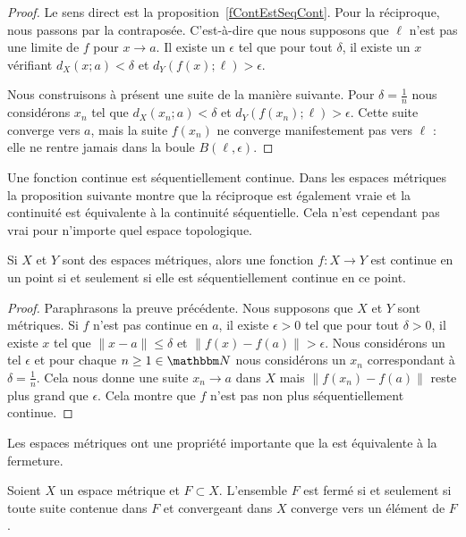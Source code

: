 \begin{proof}
  Le sens direct est la proposition~\ref{fContEstSeqCont}. Pour la réciproque, nous passons par la contraposée. C'est-à-dire que nous supposons que \( \ell\) n'est pas une limite de \( f\) pour \( x\to a\). Il existe un \( \epsilon\) tel que pour tout \( \delta\), il existe un \( x\) vérifiant \( d_X(x;a) <\delta\) et \( d_Y(f(x);\ell) >\epsilon\).

  Nous construisons à présent une suite de la manière suivante. Pour \( \delta=\frac{1}{ n }\) nous considérons \( x_n\) tel que \( d_X( x_n; a) <\delta\) et \( d_Y(f(x_n);\ell) > \epsilon \). Cette suite converge vers \( a\), mais la suite \( f(x_n)\) ne converge manifestement pas vers \( \ell\) : elle ne rentre jamais dans la boule \( B(\ell,\epsilon)\).
\end{proof}

Une fonction continue est séquentiellement continue. Dans les espaces métriques la proposition suivante montre que la réciproque est également vraie et la continuité est équivalente à la continuité séquentielle. Cela n'est cependant pas vrai pour n'importe quel espace topologique.

\begin{corollary}  \label{ItemWJHIooMdugfu}
    Si \( X\) et \( Y\) sont des espaces métriques, alors une fonction \( f\colon X\to Y\) est continue en un point si et seulement si elle est séquentiellement continue en ce point.
\end{corollary}

\begin{proof}
  Paraphrasons la preuve précédente. Nous supposons que \( X\) et \( Y\) sont métriques. Si \( f\) n'est pas continue en \( a\), il existe \( \epsilon>0\) tel que pour tout \( \delta>0\), il existe \( x\) tel que \( \| x-a \|\leq\delta\) et \( \| f(x)-f(a) \|>\epsilon\). Nous considérons un tel \( \epsilon\) et pour chaque \( n\geq1\in \eN\) nous considérons un \( x_n\) correspondant à \( \delta=\frac{1}{ n }\). Cela nous donne une suite \( x_n\to a\) dans \( X\) mais \( \| f(x_n) -f(a)\|\) reste plus grand que \( \epsilon\). Cela montre que \( f\) n'est pas non plus séquentiellement continue.
\end{proof}

Les espaces métriques ont une propriété importante que la  est équivalente à la fermeture.
\begin{proposition}    \label{PropLFBXIjt}
    Soient \( X\) un espace métrique et \( F\subset X\). L'ensemble \( F\) est fermé si et seulement si toute suite contenue dans \( F\) et convergeant dans \( X\) converge vers un élément de \( F\).
\end{proposition}

